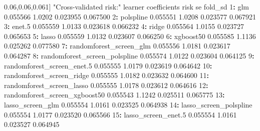 \documentclass[12pt, krantz2,]{krantz}
\newenvironment{Shaded}{\begin{snugshade}}{\end{snugshade}}
\newcommand{\DecValTok}[1]{\textcolor[rgb]{0.06,0.06,0.06}{#1}}
\newcommand{\FloatTok}[1]{\textcolor[rgb]{0.06,0.06,0.06}{#1}}
\newcommand{\NormalTok}[1]{#1}
\newcommand{\OperatorTok}[1]{\textcolor[rgb]{0.43,0.43,0.43}{\textbf{#1}}}
\newcommand{\StringTok}[1]{\textcolor[rgb]{0.5,0.5,0.5}{#1}}
\theoremstyle{definition}
\theoremstyle{definition}
\theoremstyle{definition}
\newcommand{\1}{\mathbbm{1}}
\begin{document}
\begin{Shaded}
\begin{Highlighting}[]
\NormalTok{[}\DecValTok{1}\NormalTok{] }\StringTok{"Cross-validated risk:"}
\NormalTok{                          learner coefficients   risk       se  fold_sd}
 \DecValTok{1}\OperatorTok{:}\StringTok{                           }\NormalTok{glm     }\FloatTok{0.055566} \FloatTok{1.0202} \FloatTok{0.023955} \FloatTok{0.067500}
 \DecValTok{2}\OperatorTok{:}\StringTok{                     }\NormalTok{polspline     }\FloatTok{0.055551} \FloatTok{1.0208} \FloatTok{0.023577} \FloatTok{0.067921}
 \DecValTok{3}\OperatorTok{:}\StringTok{                        }\NormalTok{enet}\FloatTok{.5}     \FloatTok{0.055559} \FloatTok{1.0133} \FloatTok{0.023618} \FloatTok{0.066232}
 \DecValTok{4}\OperatorTok{:}\StringTok{                         }\NormalTok{ridge     }\FloatTok{0.055564} \FloatTok{1.0155} \FloatTok{0.023727} \FloatTok{0.065653}
 \DecValTok{5}\OperatorTok{:}\StringTok{                         }\NormalTok{lasso     }\FloatTok{0.055559} \FloatTok{1.0132} \FloatTok{0.023607} \FloatTok{0.066250}
 \DecValTok{6}\OperatorTok{:}\StringTok{                     }\NormalTok{xgboost50     }\FloatTok{0.055585} \FloatTok{1.1136} \FloatTok{0.025262} \FloatTok{0.077580}
 \DecValTok{7}\OperatorTok{:}\StringTok{       }\NormalTok{randomforest_screen_glm     }\FloatTok{0.055556} \FloatTok{1.0181} \FloatTok{0.023617} \FloatTok{0.064287}
 \DecValTok{8}\OperatorTok{:}\StringTok{ }\NormalTok{randomforest_screen_polspline     }\FloatTok{0.055574} \FloatTok{1.0122} \FloatTok{0.023604} \FloatTok{0.064125}
 \DecValTok{9}\OperatorTok{:}\StringTok{    }\NormalTok{randomforest_screen_enet}\FloatTok{.5}     \FloatTok{0.055555} \FloatTok{1.0179} \FloatTok{0.023619} \FloatTok{0.064642}
\DecValTok{10}\OperatorTok{:}\StringTok{     }\NormalTok{randomforest_screen_ridge     }\FloatTok{0.055555} \FloatTok{1.0182} \FloatTok{0.023632} \FloatTok{0.064600}
\DecValTok{11}\OperatorTok{:}\StringTok{     }\NormalTok{randomforest_screen_lasso     }\FloatTok{0.055555} \FloatTok{1.0178} \FloatTok{0.023612} \FloatTok{0.064616}
\DecValTok{12}\OperatorTok{:}\StringTok{ }\NormalTok{randomforest_screen_xgboost50     }\FloatTok{0.055543} \FloatTok{1.1242} \FloatTok{0.025511} \FloatTok{0.065775}
\DecValTok{13}\OperatorTok{:}\StringTok{              }\NormalTok{lasso_screen_glm     }\FloatTok{0.055554} \FloatTok{1.0161} \FloatTok{0.023525} \FloatTok{0.064938}
\DecValTok{14}\OperatorTok{:}\StringTok{        }\NormalTok{lasso_screen_polspline     }\FloatTok{0.055554} \FloatTok{1.0177} \FloatTok{0.023520} \FloatTok{0.065566}
\DecValTok{15}\OperatorTok{:}\StringTok{           }\NormalTok{lasso_screen_enet}\FloatTok{.5}     \FloatTok{0.055554} \FloatTok{1.0161} \FloatTok{0.023527} \FloatTok{0.064945}

\end{Highlighting}
\end{Shaded}
\end{document}
